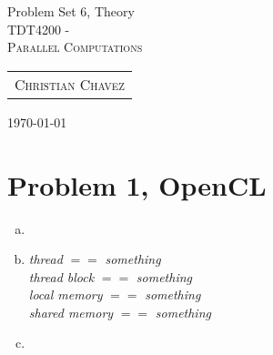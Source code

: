 \documentclass[fontsize=11pt, paper=a4, titlepage]{article}
\begin{document}
\begin{center}

{\huge Problem Set 6, Theory}\\[0.5cm]

\textsc{\LARGE TDT4200 -}\\[0.5cm]
\textsc{\large Parallel Computations}\\[1.0cm]

\begin{table}[h]
    \centering
    \begin{tabular}{c}
        \textsc{Christian Chavez}
    \end{tabular}
\end{table}

\end{center}
\vfill
\hfill \large{\today}
\clearpage

\section*{Problem 1, OpenCL}
    \begin{enumerate}[a)]

        \item

        \item
        \textit{thread} $==$ \textit{something} \\
        \textit{thread block} $==$ \textit{something} \\
        \textit{local memory} $==$ \textit{something} \\
        \textit{shared memory} $==$ \textit{something} \\

        \item

    \end{enumerate}
\end{document}
